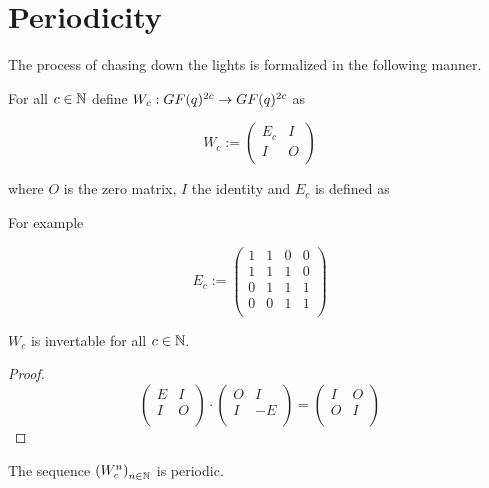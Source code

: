 \section{Periodicity}

The process of chasing down the lights is formalized in the following
manner.

For all $c\in\mathbb{N}$ define $W_{c} : GF(q)^{2c} \rightarrow GF(q)^{2c}$
as

\[
W_{c} := \left(
\begin{array}{cc}
  E_{c} & I \\
  I    & O \\
\end{array}
\right)
\]

where $O$ is the zero matrix, $I$ the identity and $E_{c}$ is defined
as

For example

\[
E_{c} := \left(
\begin{array}{cccc}
  1 & 1 & 0 & 0 \\
  1 & 1 & 1 & 0 \\
  0 & 1 & 1 & 1 \\
  0 & 0 & 1 & 1 \\
\end{array}
\right)
\]

\begin{lemma}
  $W_{c}$ is invertable for all $c\in\mathbb{N}$.
\end{lemma}

\begin{proof}
  \[
  \left(
  \begin{array}{cc}
    E & I \\
    I & O \\
  \end{array}
  \right)
  \cdot
  \left(
  \begin{array}{cc}
    O & I  \\
    I & -E \\
  \end{array}
  \right)
  =
  \left(
  \begin{array}{cc}
    I & O \\
    O & I \\
  \end{array}			
  \right)
  \]
\end{proof}

\begin{theorem}
  The sequence $\left(W_{c}^{n}\right)_{n\in\mathbb{N}}$ is periodic.
\end{theorem}

